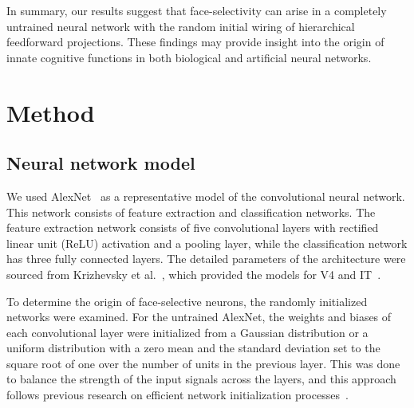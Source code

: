 \documentclass[sn-mathphys]{sn-jnl}%
\theoremstyle{thmstyleone}%
\theoremstyle{thmstyletwo}%
\theoremstyle{thmstylethree}%
\begin{document}
In summary, our results suggest that face-selectivity can arise in a completely untrained neural network with the random initial wiring of hierarchical feedforward projections.
These findings may provide insight into the origin of innate cognitive functions in both biological and artificial neural networks.


\section{Method}

\subsection{Neural network model} \label{sec:nn}
We used AlexNet~\cite{krizhevsky2012imagenet} as a representative model of the convolutional neural network.
This network consists of feature extraction and classification networks.
The feature extraction network consists of five convolutional layers with rectified linear unit (ReLU) activation and a pooling layer, while the classification network has three fully connected layers.
The detailed parameters of the architecture were sourced from Krizhevsky et al.~\cite{krizhevsky2012imagenet}, which provided the models for V4 and IT~\cite{cadieu2014deep}.


To determine the origin of face-selective neurons, the randomly initialized networks were examined.
For the untrained AlexNet, the weights and biases of each convolutional layer were initialized from a Gaussian distribution or a uniform distribution with a zero mean and the standard deviation set to the square root of one over the number of units in the previous layer.
This was done to balance the strength of the input signals across the layers, 
and this approach follows previous research on efficient network initialization processes~\cite{lecun2012efficient}.
\end{document}
